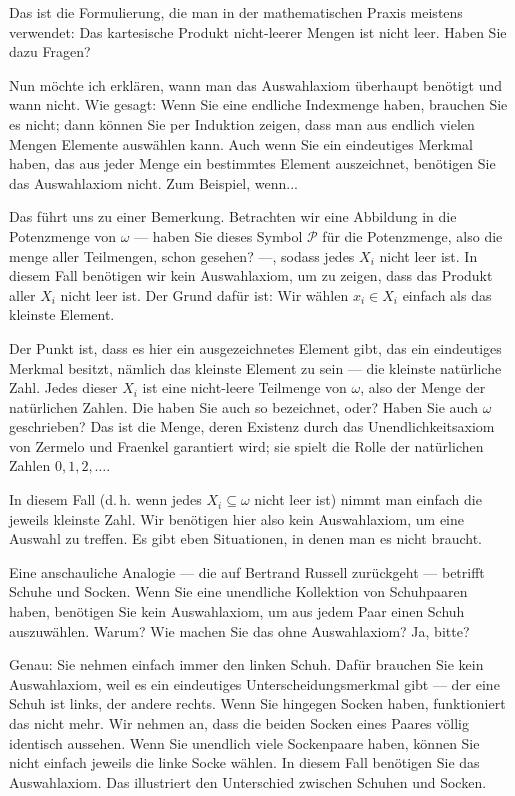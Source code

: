 \begin{spoken-clean}[00:27:02 - 00:28:43]
Das ist die Formulierung, die man in der mathematischen Praxis meistens verwendet: Das kartesische Produkt nicht-leerer Mengen ist nicht leer. Haben Sie dazu Fragen?

Nun möchte ich erklären, wann man das Auswahlaxiom überhaupt benötigt und wann nicht. Wie gesagt: Wenn Sie eine endliche Indexmenge haben, brauchen Sie es nicht; dann können Sie per Induktion zeigen, dass man aus endlich vielen Mengen Elemente auswählen kann. Auch wenn Sie ein eindeutiges Merkmal haben, das aus jeder Menge ein bestimmtes Element auszeichnet, benötigen Sie das Auswahlaxiom nicht. Zum Beispiel, wenn...

Das führt uns zu einer Bemerkung. Betrachten wir eine Abbildung in die Potenzmenge von $\omega$ --- haben Sie dieses Symbol $\mathcal{P}$ für die Potenzmenge, also die menge aller Teilmengen, schon gesehen? ---, sodass jedes $X_i$ nicht leer ist. In diesem Fall benötigen wir kein Auswahlaxiom, um zu zeigen, dass das Produkt aller $X_i$ nicht leer ist. Der Grund dafür ist: Wir wählen $x_i \in X_i$ einfach als das kleinste Element.

Der Punkt ist, dass es hier ein ausgezeichnetes Element gibt, das ein eindeutiges Merkmal besitzt, nämlich das kleinste Element zu sein --- die kleinste natürliche Zahl. Jedes dieser $X_i$ ist eine nicht-leere Teilmenge von $\omega$, also der Menge der natürlichen Zahlen. Die haben Sie auch so bezeichnet, oder? Haben Sie auch $\omega$ geschrieben? Das ist die Menge, deren Existenz durch das Unendlichkeitsaxiom von Zermelo und Fraenkel garantiert wird; sie spielt die Rolle der natürlichen Zahlen $0, 1, 2, \dots$.

In diesem Fall (d.\,h. wenn jedes $X_i \subseteq \omega$ nicht leer ist) nimmt man einfach die jeweils kleinste Zahl. Wir benötigen hier also kein Auswahlaxiom, um eine Auswahl zu treffen. Es gibt eben Situationen, in denen man es nicht braucht.

Eine anschauliche Analogie --- die auf Bertrand Russell zurückgeht --- betrifft Schuhe und Socken. Wenn Sie eine unendliche Kollektion von Schuhpaaren haben, benötigen Sie kein Auswahlaxiom, um aus jedem Paar einen Schuh auszuwählen. Warum? Wie machen Sie das ohne Auswahlaxiom? Ja, bitte?


Genau: Sie nehmen einfach immer den linken Schuh. Dafür brauchen Sie kein Auswahlaxiom, weil es ein eindeutiges Unterscheidungsmerkmal gibt --- der eine Schuh ist links, der andere rechts. Wenn Sie hingegen Socken haben, funktioniert das nicht mehr. Wir nehmen an, dass die beiden Socken eines Paares völlig identisch aussehen. Wenn Sie unendlich viele Sockenpaare haben, können Sie nicht einfach jeweils die linke Socke wählen. In diesem Fall benötigen Sie das Auswahlaxiom. Das illustriert den Unterschied zwischen Schuhen und Socken.
\end{spoken-clean}

